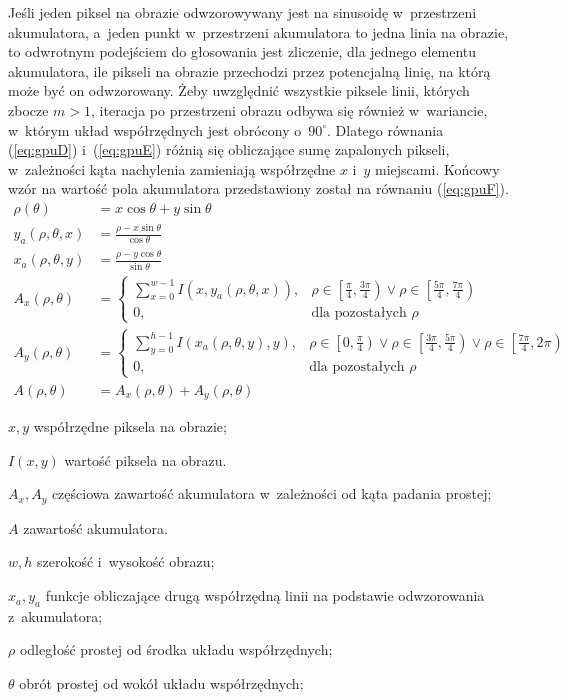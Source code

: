 Jeśli jeden piksel na obrazie odwzorowywany jest na sinusoidę w~przestrzeni akumulatora, a~jeden punkt w~przestrzeni akumulatora to jedna linia na obrazie, to odwrotnym podejściem do głosowania jest zliczenie, dla jednego elementu akumulatora, ile pikseli na obrazie przechodzi przez potencjalną linię, na którą może być on odwzorowany. Żeby uwzględnić wszystkie piksele linii, których zbocze $m > 1$, iteracja po przestrzeni obrazu odbywa się również w~wariancie, w~którym układ współrzędnych jest obrócony o~$90^\circ$. Dlatego równania (\ref{eq:gpuD}) i~(\ref{eq:gpuE}) różnią się obliczające sumę zapalonych pikseli, w~zależności kąta nachylenia zamieniają współrzędne $x$ i~$y$ miejscami.
Końcowy wzór na wartość pola akumulatora przedstawiony został na równaniu (\ref{eq:gpuF}).
\begin{align}
    \rho(\theta) &= x\cos{\theta} + y\sin{\theta} \label{eq:gpuA} \\
    y_a(\rho,\theta,x) &= \frac{\rho-x\sin{\theta}}{\cos{\theta}} \label{eq:gpuB}\\
    x_a(\rho,\theta,y) &= \frac{\rho-y\cos{\theta}}{\sin{\theta}} \label{eq:gpuC}\\
    A_x(\rho, \theta) &= 
    \begin{cases} 
    \sum^{w-1}_{x=0}I(x, y_a(\rho,\theta,x)),&\rho \in \left[\frac{\pi}{4}, \frac{3\pi}{4}\right) \lor \rho \in \left[\frac{5\pi}{4}, \frac{7\pi}{4}\right) \\
    0,& \text{dla pozostałych }\rho
    \end{cases} \label{eq:gpuD}\\
    A_y(\rho, \theta) &= 
    \begin{cases} 
    \sum^{h-1}_{y=0} I(x_a(\rho,\theta,y), y),& \rho \in \left[0, \frac{\pi}{4}\right) \lor \rho \in \left[\frac{3\pi}{4}, \frac{5\pi}{4}\right) \lor \rho \in \left[\frac{7\pi}{4}, 2\pi\right) \\
    0,& \text{dla pozostałych }\rho
    \end{cases} \label{eq:gpuE}\\
    A(\rho, \theta) &= A_x(\rho, \theta) + A_y(\rho, \theta) \label{eq:gpuF}
\end{align}
\begin{eqexpl}
    \item{$x, y$} współrzędne piksela na obrazie;
    \item{$I(x, y)$} wartość piksela na obrazu.
    \item{$A_x, A_y$} częściowa zawartość akumulatora w~zależności od kąta padania prostej;
    \item{$A$} zawartość akumulatora.
    \item{$w, h$} szerokość i~wysokość obrazu;
    \item{$x_a, y_a$} funkcje obliczające drugą współrzędną linii na podstawie odwzorowania z~akumulatora;
    \item{$\rho$} odległość prostej od środka układu współrzędnych;
    \item{$\theta$} obrót prostej od wokół układu współrzędnych;
\end{eqexpl}
\vspace{0.5cm}


